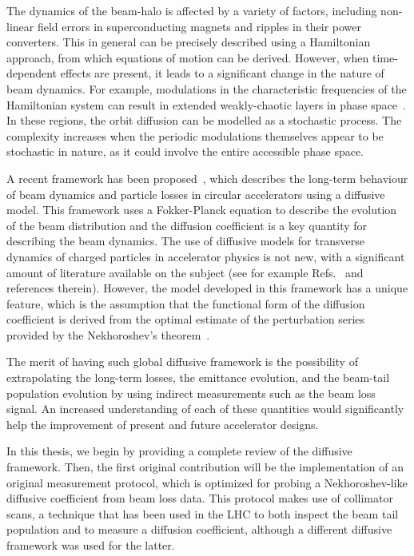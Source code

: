 The dynamics of the beam-halo is affected by a variety of factors, including non-linear field errors in superconducting magnets and ripples in their power converters. This in general can be precisely described using a Hamiltonian approach, from which equations of motion can be derived. However, when time-dependent effects are present, it leads to a significant change in the nature of beam dynamics. For example, modulations in the characteristic frequencies of the Hamiltonian system can result in extended weakly-chaotic layers in phase space~\cite{NEISHTADT1991}. In these regions, the orbit diffusion can be modelled as a stochastic process. The complexity increases when the periodic modulations themselves appear to be stochastic in nature, as it could involve the entire accessible phase space.

A recent framework has been proposed~\cite{Bazzani:2019lse,bazzani2020diffusion}, which describes the long-term behaviour of beam dynamics and particle losses in circular accelerators using a diffusive model. This framework uses a Fokker-Planck equation to describe the evolution of the beam distribution and the diffusion coefficient is a key quantity for describing the beam dynamics. The use of diffusive models for transverse dynamics of charged particles in accelerator physics is not new, with a significant amount of literature available on the subject (see for example Refs.~{\cite{Burnod:205343,Meddahi:223301,PhysRevLett.68.33,gerasimov1992applicability,MESS1994279,zimmermann1994transverse,PhysRevLett.77.1051,PhysRevSTAB.5.074001,flilleriii:pac03-rpag004,stancari2011diffusion,stancari:ipac11-tupz033,PhysRevSTAB.15.101001,Stancari:1637929}} and references therein). However, the model developed in this framework has a unique feature, which is the assumption that the functional form of the diffusion coefficient is derived from the optimal estimate of the perturbation series provided by the Nekhoroshev's theorem~\cite{Nekhoroshev:1977aa,Bazzani:1990aa,Turchetti:1990aa}.

The merit of having such global diffusive framework is the possibility of extrapolating the long-term losses, the emittance evolution, and the beam-tail population evolution by using indirect measurements such as the beam loss signal. An increased understanding of each of these quantities would significantly help the improvement of present and future accelerator designs. 

In this thesis, we begin by providing a complete review of the diffusive framework. Then, the first original contribution will be the implementation of an original measurement protocol, which is optimized for probing a Nekhoroshev-like diffusive coefficient from beam loss data. This protocol makes use of collimator scans, a technique that has been used in the LHC to both inspect the beam tail population and to measure a diffusion coefficient, although a different diffusive framework was used for the latter.

